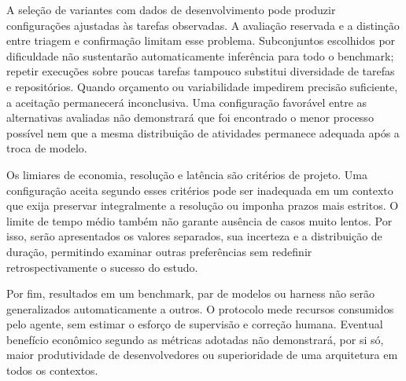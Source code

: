 A seleção de variantes com dados de desenvolvimento pode produzir configurações ajustadas às tarefas observadas. A avaliação reservada e a distinção entre triagem e confirmação limitam esse problema. Subconjuntos escolhidos por dificuldade não sustentarão automaticamente inferência para todo o benchmark; repetir execuções sobre poucas tarefas tampouco substitui diversidade de tarefas e repositórios. Quando orçamento ou variabilidade impedirem precisão suficiente, a aceitação permanecerá inconclusiva. Uma configuração favorável entre as alternativas avaliadas não demonstrará que foi encontrado o menor processo possível nem que a mesma distribuição de atividades permanece adequada após a troca de modelo.

Os limiares de economia, resolução e latência são critérios de projeto. Uma configuração aceita segundo esses critérios pode ser inadequada em um contexto que exija preservar integralmente a resolução ou imponha prazos mais estritos. O limite de tempo médio também não garante ausência de casos muito lentos. Por isso, serão apresentados os valores separados, sua incerteza e a distribuição de duração, permitindo examinar outras preferências sem redefinir retrospectivamente o sucesso do estudo.

Por fim, resultados em um benchmark, par de modelos ou harness não serão generalizados automaticamente a outros. O protocolo mede recursos consumidos pelo agente, sem estimar o esforço de supervisão e correção humana. Eventual benefício econômico segundo as métricas adotadas não demonstrará, por si só, maior produtividade de desenvolvedores ou superioridade de uma arquitetura em todos os contextos.
